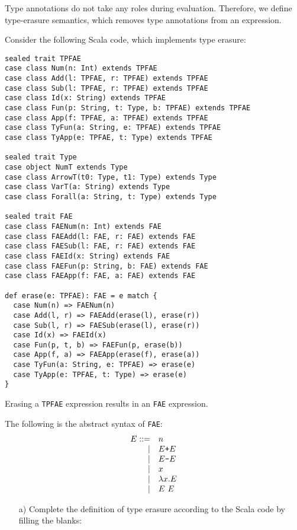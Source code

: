 \begin{enumerate}
Type annotations do not take any roles during evaluation.
Therefore, we define type-erasure semantics, which removes
type annotations from an expression.

Consider the following Scala code, which implements type erasure:
\begin{verbatim}
sealed trait TPFAE
case class Num(n: Int) extends TPFAE
case class Add(l: TPFAE, r: TPFAE) extends TPFAE
case class Sub(l: TPFAE, r: TPFAE) extends TPFAE
case class Id(x: String) extends TPFAE
case class Fun(p: String, t: Type, b: TPFAE) extends TPFAE
case class App(f: TPFAE, a: TPFAE) extends TPFAE
case class TyFun(a: String, e: TPFAE) extends TPFAE
case class TyApp(e: TPFAE, t: Type) extends TPFAE

sealed trait Type
case object NumT extends Type
case class ArrowT(t0: Type, t1: Type) extends Type
case class VarT(a: String) extends Type
case class Forall(a: String, t: Type) extends Type

sealed trait FAE
case class FAENum(n: Int) extends FAE
case class FAEAdd(l: FAE, r: FAE) extends FAE
case class FAESub(l: FAE, r: FAE) extends FAE
case class FAEId(x: String) extends FAE
case class FAEFun(p: String, b: FAE) extends FAE
case class FAEApp(f: FAE, a: FAE) extends FAE

def erase(e: TPFAE): FAE = e match {
  case Num(n) => FAENum(n)
  case Add(l, r) => FAEAdd(erase(l), erase(r))
  case Sub(l, r) => FAESub(erase(l), erase(r))
  case Id(x) => FAEId(x)
  case Fun(p, t, b) => FAEFun(p, erase(b))
  case App(f, a) => FAEApp(erase(f), erase(a))
  case TyFun(a: String, e: TPFAE) => erase(e)
  case TyApp(e: TPFAE, t: Type) => erase(e)
}
\end{verbatim}
Erasing a \texttt{TPFAE} expression results in an \texttt{FAE} expression.

The following is the abstract syntax of \texttt{FAE}:
\[
\begin{array}{rl}
E::= & n \\
\mid& E\verb!+!E \\
\mid& E\verb!-!E \\
\mid& x  \\
\mid& \lambda x.E \\
\mid& E\ E  \\
\end{array}
\]

\begin{itemize}
\item[a)] Complete the definition of type erasure  according to the Scala code
by filling the blanks:
\end{itemize}


\end{enumerate}
